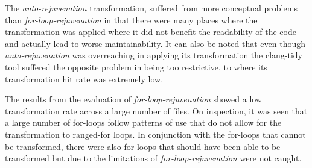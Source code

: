 \documentclass[bsc,frontabs,singlespacing,twoside,parskip,deptreport]{infthesis}
\begin{document}
The \textit{auto-rejuvenation} transformation, suffered from more conceptual problems than \textit{for-loop-rejuvenation} in that there were many places where the transformation was applied where it did not benefit the readability of the code and actually lead to worse maintainability. It can also be noted that even though \textit{auto-rejuvenation} was overreaching in applying its transformation the clang-tidy tool suffered the opposite problem in being too restrictive, to where its transformation hit rate was extremely low.  

The results from the evaluation of \textit{for-loop-rejuvenation} showed a low transformation rate across a large number of files. On inspection, it was seen that a large number of for-loops follow patterns of use that do not allow for the transformation to ranged-for loops. In conjunction with the for-loops that cannot be transformed, there were also for-loops that should have been able to be transformed but due to the limitations of \textit{for-loop-rejuvenation} were not caught.



    
\end{document}
